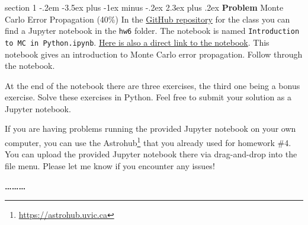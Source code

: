 \documentclass[letterpaper,12pt,twoside=false,DIV=11]{scrartcl}
\makeatletter
\newenvironment{problem}{\@startsection
    {section}
    {1}
    {-.2em}
    {-3.5ex plus -1ex minus -.2ex}
    {2.3ex plus .2ex}
    {
        \pagebreak[3] %
        \noindent\sffamily\bfseries Problem
    }
}
{
    \begin{center}\large\bfseries\ldots\ldots\ldots\end{center}
}
\makeatother
\begin{document}
\begin{problem}{Monte Carlo Error Propagation (40\%)}
In the \href{https://github.com/galactic-forensics/lecture_origin_elements}{GitHub repository} for the class you can find a Jupyter notebook in the \texttt{hw6} folder. The notebook is named \texttt{Introduction to MC in Python.ipynb}. \href{https://github.com/galactic-forensics/lecture_origin_elements/blob/main/homework/hw6/Introduction%20MC%20in%20Python.ipynb}{Here is also a direct link to the notebook}. This notebook gives an introduction to Monte Carlo error propagation. Follow through the notebook.

At the end of the notebook there are three exercises, the third one being a bonus exercise. Solve these exercises in Python. Feel free to submit your solution as a Jupyter notebook.

If you are having problems running the provided Jupyter notebook on your own computer, you can use the Astrohub\footnote{\url{https://astrohub.uvic.ca}} that you already used for homework \#4. You can upload the provided Jupyter notebook there via drag-and-drop into the file menu. Please let me know if you encounter any issues!
\end{problem}
\end{document}
